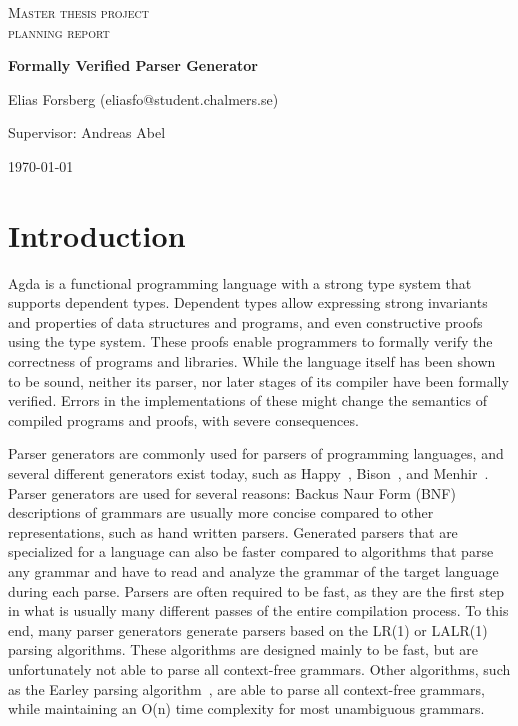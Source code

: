\documentclass{article}
\begin{document}
\begin{titlepage}


\centering


{\scshape\LARGE Master thesis project \\ planning report\\}

\vspace{0.5cm}

{\huge\bfseries Formally Verified Parser Generator\\}

\vspace{2cm}

{\Large Elias Forsberg (eliasfo@student.chalmers.se)\\}

\vspace{1.0cm}

{\large Supervisor: Andreas Abel\\}

\vfill

{\large \today\\}

\end{titlepage}

\section{Introduction}

	Agda is a functional programming language with a strong type system that
	supports dependent types. Dependent types allow expressing strong invariants and
	properties of data structures and programs, and even constructive proofs
	using the type system. These proofs enable programmers to formally verify
	the correctness of programs and libraries. While the language itself has
	been shown to be sound, neither its parser, nor later stages of its
	compiler have been formally verified. Errors in the implementations of
	these might change the semantics of compiled programs and proofs,
	with severe consequences. %

	Parser generators are commonly used for parsers of programming languages,
	and several different generators exist today, such as Happy~\cite{Happy},
	Bison~\cite{Bison}, and Menhir~\cite{Menhir}. Parser generators are used
	for several reasons: Backus Naur Form (BNF) descriptions of grammars are
	usually more concise compared to other representations, such as hand
	written parsers. Generated parsers that are specialized for a language can
	also be faster compared to algorithms that parse any grammar and have to
	read and analyze the grammar of the target language during each parse.
	Parsers are often required to be fast, as they are the first step in what
	is usually many different passes of the entire compilation process. To this
	end, many parser generators generate parsers based on the LR(1) or LALR(1)
	parsing algorithms. These algorithms are designed mainly to be fast, but
	are unfortunately not able to parse all context-free grammars. Other
	algorithms, such as the Earley parsing algorithm~\cite{Earley}, are able to
	parse all context-free grammars, while maintaining an O(n) time complexity
	for most unambiguous grammars.
\end{document}
